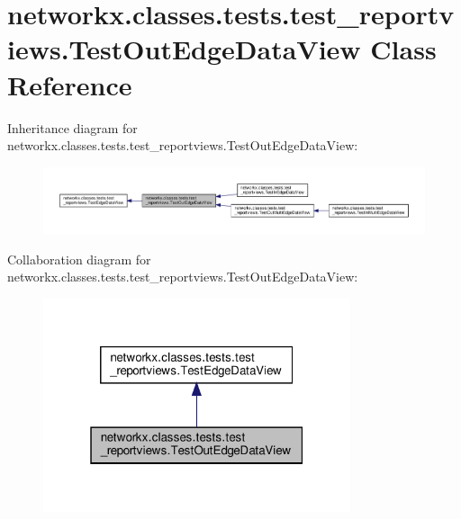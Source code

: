 \hypertarget{classnetworkx_1_1classes_1_1tests_1_1test__reportviews_1_1TestOutEdgeDataView}{}\section{networkx.\+classes.\+tests.\+test\+\_\+reportviews.\+Test\+Out\+Edge\+Data\+View Class Reference}
\label{classnetworkx_1_1classes_1_1tests_1_1test__reportviews_1_1TestOutEdgeDataView}


Inheritance diagram for networkx.\+classes.\+tests.\+test\+\_\+reportviews.\+Test\+Out\+Edge\+Data\+View\+:
\nopagebreak
\begin{figure}[H]
\begin{center}
\leavevmode
\includegraphics[width=350pt]{classnetworkx_1_1classes_1_1tests_1_1test__reportviews_1_1TestOutEdgeDataView__inherit__graph}
\end{center}
\end{figure}


Collaboration diagram for networkx.\+classes.\+tests.\+test\+\_\+reportviews.\+Test\+Out\+Edge\+Data\+View\+:
\nopagebreak
\begin{figure}[H]
\begin{center}
\leavevmode
\includegraphics[width=256pt]{classnetworkx_1_1classes_1_1tests_1_1test__reportviews_1_1TestOutEdgeDataView__coll__graph}
\end{center}
\end{figure}
